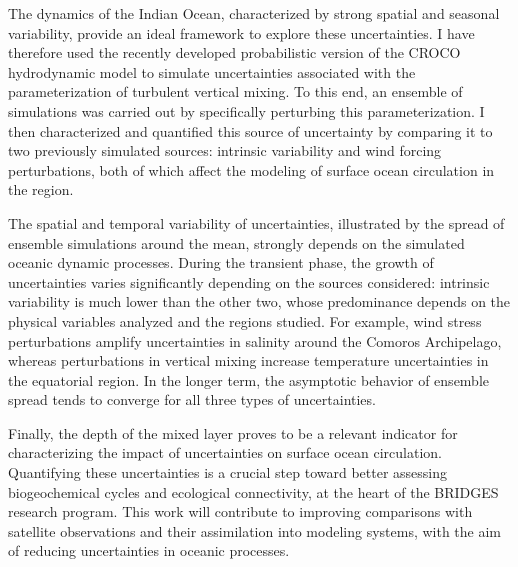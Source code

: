 \documentclass[
11pt, %
oneside, %
french, %
onehalfspacing, %
liststotoc, %
headsepline, %
chapterinoneline, %
]{MastersDoctoralThesis} %
\begin{document}
The dynamics of the Indian Ocean, characterized by strong spatial and seasonal variability, provide an ideal framework to explore these uncertainties. I have therefore used the recently developed probabilistic version of the CROCO hydrodynamic model to simulate uncertainties associated with the parameterization of turbulent vertical mixing. To this end, an ensemble of simulations was carried out by specifically perturbing this parameterization. I then characterized and quantified this source of uncertainty by comparing it to two previously simulated sources: intrinsic variability and wind forcing perturbations, both of which affect the modeling of surface ocean circulation in the region.

The spatial and temporal variability of uncertainties, illustrated by the spread of ensemble simulations around the mean, strongly depends on the simulated oceanic dynamic processes. During the transient phase, the growth of uncertainties varies significantly depending on the sources considered: intrinsic variability is much lower than the other two, whose predominance depends on the physical variables analyzed and the regions studied. For example, wind stress perturbations amplify uncertainties in salinity around the Comoros Archipelago, whereas perturbations in vertical mixing increase temperature uncertainties in the equatorial region. In the longer term, the asymptotic behavior of ensemble spread tends to converge for all three types of uncertainties.

Finally, the depth of the mixed layer proves to be a relevant indicator for characterizing the impact of uncertainties on surface ocean circulation. Quantifying these uncertainties is a crucial step toward better assessing biogeochemical cycles and ecological connectivity, at the heart of the BRIDGES research program. This work will contribute to improving comparisons with satellite observations and their assimilation into modeling systems, with the aim of reducing uncertainties in oceanic processes.


\tableofcontents %

\end{document}
